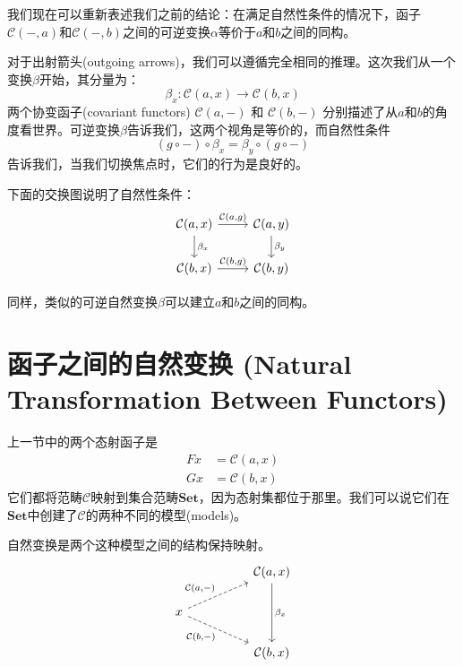 \documentclass[DaoFP]{subfiles}
\begin{document}
    我们现在可以重新表述我们之前的结论：在满足自然性条件的情况下，函子$\mathcal{C}(-, a)$和$\mathcal{C}(-, b)$之间的可逆变换$\alpha$等价于$a$和$b$之间的同构。

    对于出射箭头(outgoing arrows)，我们可以遵循完全相同的推理。这次我们从一个变换$\beta$开始，其分量为：
    \[ \beta_x \colon \mathcal{C}(a, x) \to \mathcal{C}(b, x) \]
    两个协变函子(covariant functors) $\mathcal{C}(a, -)$ 和 $\mathcal{C}(b, -)$ 分别描述了从$a$和$b$的角度看世界。可逆变换$\beta$告诉我们，这两个视角是等价的，而自然性条件
    \[ (g \circ -) \circ \beta_x = \beta_y \circ (g \circ -) \]
    告诉我们，当我们切换焦点时，它们的行为是良好的。

    下面的交换图说明了自然性条件：
    \[
        \begin{tikzcd}
            \mathcal{C}(a, x)
            \arrow[d, "\beta_x"]
            \arrow[r, "{\mathcal{C}(a, g)}"]
            &
            \mathcal{C}(a, y)
            \arrow[d, "\beta_y"]
            \\
            \mathcal{C}(b, x)
            \arrow[r, "{\mathcal{C}(b, g)}"]
            & \mathcal{C}(b, y)
        \end{tikzcd}
    \]

    同样，类似的可逆自然变换$\beta$可以建立$a$和$b$之间的同构。

    \section{函子之间的自然变换 (Natural Transformation Between Functors)}

    上一节中的两个态射函子是
    \begin{align*}
        F x &=   \mathcal{C}(a, x) \\
        G x &=   \mathcal{C}(b, x)
    \end{align*}
    它们都将范畴$\mathcal{C}$映射到集合范畴$\mathbf{Set}$，因为态射集都位于那里。我们可以说它们在$\mathbf{Set}$中创建了$\mathcal{C}$的两种不同的模型(models)。

    自然变换是两个这种模型之间的结构保持映射。
    \[
        \begin{tikzcd}
            && \cat C(a, x)
            \arrow[dd, "\beta_x"]
            \\
            x
            \arrow[rru, dashed, "{\cat C(a, -)}"]
            \arrow[rrd, dashed, "{\cat C(b, -)}"']
            \\
            && \cat C(b, x)
        \end{tikzcd}
    \]
\end{document}
